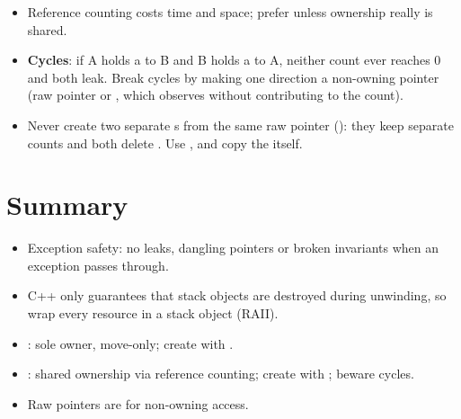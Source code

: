 \begin{important}[Caveats]
\begin{itemize}
  \item Reference counting costs time and space; prefer  unless
        ownership really is shared.
  \item \textbf{Cycles}: if A holds a  to B and B holds a
         to A, neither count ever reaches 0 and both leak.
        Break cycles by making one direction a non-owning pointer (raw pointer or
        , which observes without contributing to the count).
  \item Never create two separate s from the same raw pointer
        (): they keep separate counts and
        both delete . Use , and copy the
         itself.
\end{itemize}
\end{important}

\section*{Summary}
\begin{itemize}
  \item Exception safety: no leaks, dangling pointers or broken invariants when
        an exception passes through.
  \item C++ only guarantees that stack objects are destroyed during unwinding,
        so wrap every resource in a stack object (RAII).
  \item {}: sole owner, move-only; create with
        .
  \item {}: shared ownership via reference counting; create with
        ; beware cycles.
  \item Raw pointers are for non-owning access.
\end{itemize}
